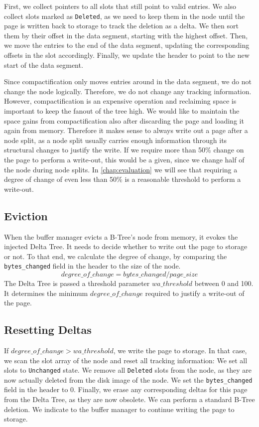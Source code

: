 First, we collect pointers to all slots that still point to valid entries.
We also collect slots marked as \texttt{Deleted}, as we need to keep them in the node until the page is written back to storage to track the deletion as a delta.
We then sort them by their offset in the data segment, starting with the highest offset.
Then, we move the entries to the end of the data segment, updating the corresponding offsets in the slot accordingly.
Finally, we update the header to point to the new start of the data segment.

Since compactification only moves entries around in the data segment, we do not change the node logically.
Therefore, we do not change any tracking information.
However, compactification is an expensive operation and reclaiming space is important to keep the fanout of the tree high.
We would like to maintain the space gains from compactification also after discarding the page and loading it again from memory.
Therefore it makes sense to always write out a page after a node split, as a node split usually carries enough information through its structural changes to justify the write.
If we require more than 50\% change on the page to perform a write-out, this would be a given, since we change half of the node during node splits.
In \ref{chap:evaluation} we will see that requiring a degree of change of even less than 50\% is a reasonable threshold to perform a write-out.

\subsection*{Eviction}
When the buffer manager evicts a B-Tree's node from memory, it evokes the injected Delta Tree.
It needs to decide whether to write out the page to storage or not.
To that end, we calculate the degree of change, by comparing the \texttt{bytes\_changed} field in the header to the size of the node.
\[degree\_of\_change = bytes\_changed / page\_size\]
The Delta Tree is passed a threshold parameter $wa\_threshold$ between 0 and 100.
It determines the minimum $degree\_of\_change$ required to justify a write-out of the page.

\subsection*{Resetting Deltas}
If $degree\_of\_change > wa\_threshold$, we write the page to storage. 
In that case, we scan the slot array of the node and reset all tracking information:
We set all slots to \texttt{Unchanged} state.
We remove all \texttt{Deleted} slots from the node, as they are now actually deleted from the disk image of the node.
We set the \texttt{bytes\_changed} field in the header to 0.
Finally, we erase any corresponding deltas for this page from the Delta Tree, as they are now obsolete.
We can perform a standard B-Tree deletion.
We indicate to the buffer manager to continue writing the page to storage.

